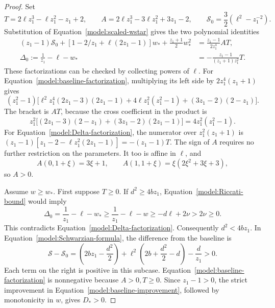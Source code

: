 \begin{proof}
Set
\begin{equation}
 T=2\ell z_1^3-\ell z_1^2-z_1+2,\qquad
 A=2\ell z_1^3-3\ell z_1^2+3z_1-2,\qquad
 \mathcal S_0=\frac32(\ell^2-z_1^{-2}).
 \label{model:T-and-baseline}
\end{equation}
Substitution of Equation~\eqref{model:scaled-wstar} gives the two
polynomial identities
\begin{align}
 (z_1-1)\mathcal S_0+
 [1-2/z_1+\ell(2z_1-1)]w_*+\frac{z_1+1}{2}w_*^2
 &=\frac{z_1-1}{2z_1^4}AT,
 \label{model:baseline-factorization}\\
 \Delta_0:=\frac1{z_1}-\ell-w_*
 &=-\frac{z_1-1}{(z_1+1)z_1^2}T.
 \label{model:Delta-factorization}
\end{align}
These factorizations can be checked by collecting powers of \(\ell\).
For Equation~\eqref{model:baseline-factorization}, multiplying its left
side by \(2z_1^4(z_1+1)\) gives
\[
 (z_1^2-1)\bigl[
   \ell^2z_1^4(2z_1-3)(2z_1-1)
   +4\ell z_1^2(z_1^2-1)+(3z_1-2)(2-z_1)\bigr].
\]
The bracket is \(AT\), because the cross coefficient in the product
is
\[
 z_1^2\bigl[(2z_1-3)(2-z_1)+(3z_1-2)(2z_1-1)\bigr]
 =4z_1^2(z_1^2-1).
\]
For Equation~\eqref{model:Delta-factorization}, the numerator over
\(z_1^2(z_1+1)\) is
\((z_1-1)[z_1-2-\ell z_1^2(2z_1-1)]=-(z_1-1)T\).
The sign of \(A\) requires no further restriction on the parameters.
It too is affine in \(\ell\), and
\[
 A(0,1+\xi)=3\xi+1,\qquad
 A(1,1+\xi)=\xi(2\xi^2+3\xi+3),
\]
so \(A>0\).

Assume \(w\ge w_*\). First suppose \(T\ge0\).
If \(d^2\ge4bz_1\), Equation~\eqref{model:Riccati-bound}
would imply
\[
 \Delta_0
 =\frac1{z_1}-\ell-w_*
 \ge\frac1{z_1}-\ell-w
 \ge-d\ell+2\nu>2\nu\ge0.
\]
This contradicts Equation~\eqref{model:Delta-factorization}.
Consequently \(d^2<4bz_1\).  In Equation~\eqref{model:Schwarzian-formula},
the difference from the baseline is
\begin{equation}
 \mathcal S-\mathcal S_0
 =\left(2bz_1-\frac{d^2}{2}\right)
   +\ell^2\left(2b+\frac{d^2}{2}-d\right)-\frac d{z_1}>0.
 \label{model:baseline-improvement}
\end{equation}
Each term on the right is positive in this subcase.
Equation~\eqref{model:baseline-factorization} is nonnegative because
\(A>0,T\ge0\).  Since \(z_1-1>0\), the strict improvement in
Equation~\eqref{model:baseline-improvement}, followed by monotonicity
in \(w\), gives \(D_*>0\).


\end{proof}
